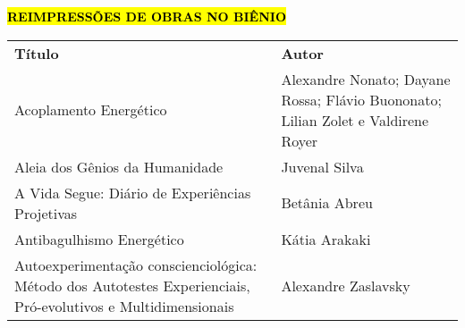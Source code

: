 \documentclass[
]{article}
\begin{document}
\textbf{\hl{REIMPRESSÕES DE OBRAS NO BIÊNIO}}

\begin{longtable}[]{@{}
  >{\raggedright\arraybackslash}p{}
  >{\raggedright\arraybackslash}p{}@{}}
\toprule\noalign{}
\begin{minipage}[b]{\linewidth}\centering
\textbf{Título}
\end{minipage} & \begin{minipage}[b]{\linewidth}\centering
\textbf{Autor}
\end{minipage} \\
\begin{minipage}[b]{\linewidth}\raggedright
Acoplamento Energético
\end{minipage} & \begin{minipage}[b]{\linewidth}\raggedright
Alexandre Nonato; Dayane Rossa; Flávio Buononato; Lilian Zolet e Valdirene Royer
\end{minipage} \\
\begin{minipage}[b]{\linewidth}\raggedright
Aleia dos Gênios da Humanidade
\end{minipage} & \begin{minipage}[b]{\linewidth}\raggedright
Juvenal Silva
\end{minipage} \\
\begin{minipage}[b]{\linewidth}\raggedright
A Vida Segue: Diário de Experiências Projetivas
\end{minipage} & \begin{minipage}[b]{\linewidth}\raggedright
Betânia Abreu
\end{minipage} \\
\begin{minipage}[b]{\linewidth}\raggedright
Antibagulhismo Energético
\end{minipage} & \begin{minipage}[b]{\linewidth}\raggedright
Kátia Arakaki
\end{minipage} \\
\begin{minipage}[b]{\linewidth}\raggedright
Autoexperimentação conscienciológica: Método dos Autotestes Experienciais, Pró-evolutivos e Multidimensionais
\end{minipage} & \begin{minipage}[b]{\linewidth}\raggedright
Alexandre Zaslavsky
\end{minipage} \\

\end{longtable}
\end{document}
